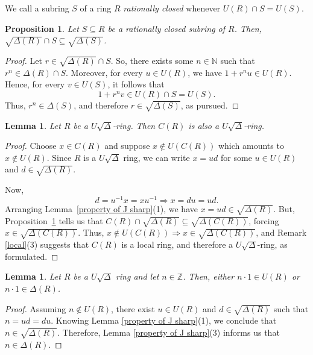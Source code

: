 \documentclass[11pt]{amsart}
\newtheorem{proposition}[theorem]{Proposition}
\newtheorem{lemma}[theorem]{Lemma}
\theoremstyle{definition}
\begin{document}
We call a subring $S$ of a ring $R$ {\it rationally closed} whenever $U(R) \cap S = U(S)$.

\begin{proposition}\label{rationally closed}
Let $S \subseteq R$ be a rationally closed subring of $R$. Then, $\sqrt{\Delta(R)} \cap S \subseteq \sqrt{\Delta(S)}$.
\end{proposition}

\begin{proof}
Let $r\in \sqrt{\Delta(R)}\cap S$. So, there exists some $n\in \mathbb{N}$ such that $r^n\in \Delta(R)\cap S$.
Moreover, for every $u\in U(R)$, we have $1+r^n u\in U(R)$. Hence, for every $v\in U(S)$, it follows that
\[
1+r^n v\in U(R)\cap S = U(S).
\]
Thus, $r^n\in \Delta(S)$, and therefore $r\in \sqrt{\Delta(S)}$, as pursued.
\end{proof}

\begin{lemma}\label{center}
Let $R$ be a $U\sqrt{\Delta}$-ring. Then $C(R)$ is also a $U\sqrt{\Delta}$-ring.
\end{lemma}

\begin{proof}
Choose $x \in C(R)$ and suppose $x \not\in U(C(R))$ which amounts to $x \not\in U(R)$. Since $R$ is a $U\sqrt{\Delta}$ ring, we can write $x = ud$ for some $u \in U(R)$ and $d \in \sqrt{\Delta(R)}$.
	
Now,
	\[
	d = u^{-1}x = xu^{-1} \Rightarrow x = du = ud.
	\]
Arranging Lemma~\ref{property of J sharp}(1), we have $x = ud \in \sqrt{\Delta(R)}$. But, Proposition~\ref{rationally closed} tells us that $C(R) \cap \sqrt{\Delta(R)} \subseteq \sqrt{\Delta(C(R))}$, forcing $x \in \sqrt{\Delta(C(R))}$. Thus, $x \not\in U(C(R)) \Rightarrow x \in \sqrt{\Delta(C(R))}$, and Remark \ref{local}(3) suggests that $C(R)$ is a local ring, and therefore a $U\sqrt{\Delta}$-ring, as formulated.
\end{proof}

\begin{lemma}
Let $R$ be a $U\sqrt{\Delta}$ ring and let $n \in \mathbb{Z}$. Then, either $n\cdot 1 \in U(R)$ or $n\cdot 1 \in \Delta(R)$.
\end{lemma}

\begin{proof}
Assuming $n \not\in U(R)$, there exist $u \in U(R)$ and $d \in \sqrt{\Delta(R)}$ such that $n = ud = du$. Knowing Lemma \ref{property of J sharp}(1), we conclude that $n \in \sqrt{\Delta(R)}$. Therefore, Lemma \ref{property of J sharp}(3) informs us that $n \in \Delta(R)$.
\end{proof}
\end{document}
